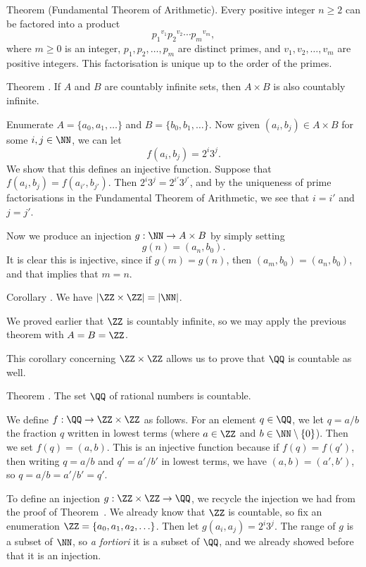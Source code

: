 \edef\thmfta{\the\thmcount}
\parenproclaim Theorem {\advthm} (Fundamental Theorem of Arithmetic). Every positive
integer $n\ge 2$ can be factored into a product
$${p_1}^{v_1} {p_2}^{v_2}\cdots {p_m}^{v_m},$$
where $m\ge 0$ is an integer, $p_1,p_2,\ldots,p_m$ are distinct primes, and
$v_1,v_2,\ldots,v_m$ are positive integers.
This factorisation is unique up to the order of the primes.\slug

\edef\thmcartesiancountable{\the\thmcount}
\proclaim Theorem \advthm. If $A$ and $B$ are countably infinite sets,
then $A\times B$ is also countably infinite.

\proof
Enumerate $A = \{a_0, a_1, \ldots\}$ and $B = \{b_0, b_1, \ldots\}$. Now given
$(a_i, b_j)\in A\times B$ for some $i,j\in \NN$, we can let
$$f(a_i, b_j) = 2^i3^j.$$
We show that this defines an injective function. Suppose that $f(a_i, b_j) = f(a_{i'}, b_{j'}).$
Then $2^i3^j = 2^{i'} 3^{j'}$, and by the uniqueness of prime factorisations in the Fundamental
Theorem of Arithmetic, we see that $i = i'$ and $j=j'$.

Now we produce an injection $g : \NN\to A\times B$ by simply setting
$$g(n) = (a_n, b_0).$$
It is clear this is injective, since if $g(m) = g(n)$, then $(a_m, b_0) = (a_n, b_0)$, and
that implies that $m=n$.\slug

\edef\corzedtwocountable{\the\thmcount}
\proclaim Corollary \advthm. We have $|\ZZ\times \ZZ| = |\NN|$.

\proof
We proved earlier that $\ZZ$ is countably infinite, so we may apply the previous theorem with $A = B = \ZZ$.\slug

This corollary concerning $\ZZ\times \ZZ$ allows us to prove that $\QQ$ is countable as well.

\proclaim Theorem \advthm. The set $\QQ$ of rational numbers is countable.

\proof We define $f:\QQ\to \ZZ\times \ZZ$ as follows. For an element $q\in \QQ$, we let $q = a/b$ the fraction $q$
written in lowest terms (where $a\in \ZZ$ and $b\in \NN\setminus\{0\}$). Then we set $f(q) = (a,b)$.
This is an injective function because if $f(q) = f(q')$, then writing $q = a/b$ and $q' = a'/b'$ in lowest
terms, we have $(a,b) = (a',b')$, so $q = a/b = a'/b' = q'$.

To define an injection $g: \ZZ\times \ZZ\to \QQ$, we recycle the injection we had from the proof
of Theorem~{\thmcartesiancountable}. We already know that $\ZZ$ is countable, so fix an enumeration
$\ZZ = \{a_0, a_1, a_2, \ldots\}$. Then let $g(a_i, a_j) = 2^i 3^j$. The range of $g$ is a subset of $\NN$,
so {\it a fortiori} it is a subset of $\QQ$, and we already showed before that it is an injection.

